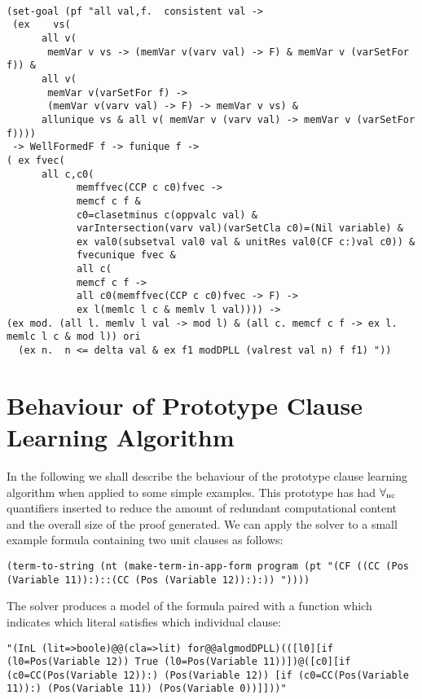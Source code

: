 \begin{lstlisting}

(set-goal (pf "all val,f.  consistent val -> 
 (ex    vs(
      all v(
       memVar v vs -> (memVar v(varv val) -> F) & memVar v (varSetFor f)) & 
      all v(
       memVar v(varSetFor f) -> 
       (memVar v(varv val) -> F) -> memVar v vs) & 
      allunique vs & all v( memVar v (varv val) -> memVar v (varSetFor f))))
 -> WellFormedF f -> funique f ->
( ex fvec(
      all c,c0(
            memffvec(CCP c c0)fvec -> 
            memcf c f & 
            c0=clasetminus c(oppvalc val) & 
            varIntersection(varv val)(varSetCla c0)=(Nil variable) & 
            ex val0(subsetval val0 val & unitRes val0(CF c:)val c0)) & 
            fvecunique fvec &
            all c(
            memcf c f -> 
            all c0(memffvec(CCP c c0)fvec -> F) -> 
            ex l(memlc l c & memlv l val)))) ->
(ex mod. (all l. memlv l val -> mod l) & (all c. memcf c f -> ex l. memlc l c & mod l)) ori 
  (ex n.  n <= delta val & ex f1 modDPLL (valrest val n) f f1) "))
\end{lstlisting}

\section{Behaviour of Prototype Clause Learning Algorithm}
In the following we shall describe the behaviour of the prototype clause learning algorithm when applied to some simple examples. This prototype has had $\forall_{\mathrm{nc}}$ quantifiers inserted to reduce the amount of redundant computational content and the overall size of the proof generated. We can apply the solver to a small example formula containing two unit clauses as follows:

\begin{center}\texttt{(term-to-string (nt (make-term-in-app-form program (pt "(CF ((CC (Pos (Variable 11)):)::(CC (Pos (Variable 12)):):)) "))))}
\end{center}

The solver produces a model of the formula paired with a function which indicates which literal satisfies which individual clause:

\begin{center}
\texttt{"(InL (lit=>boole)@@(cla=>lit) for@@algmodDPLL)(([l0][if (l0=Pos(Variable 12)) True (l0=Pos(Variable 11))])@([c0][if (c0=CC(Pos(Variable 12)):) (Pos(Variable 12)) [if (c0=CC(Pos(Variable 11)):) (Pos(Variable 11)) (Pos(Variable 0))]]))"}                                                                      
\end{center}


